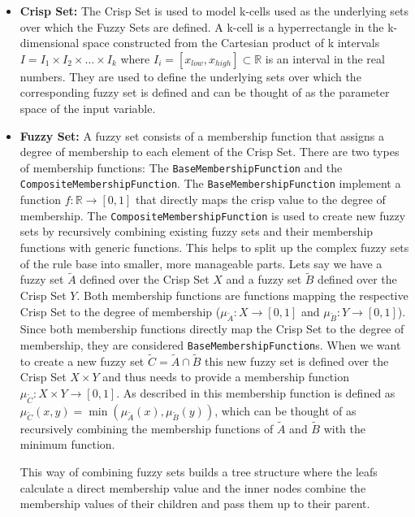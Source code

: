 \begin{itemize}
  \item \textbf{Crisp Set:} The Crisp Set is used to model k-cells used as the underlying sets over which the Fuzzy Sets are defined. A k-cell is a hyperrectangle in the k-dimensional space constructed from the Cartesian product of k intervals $I = I_1 \times I_2 \times \ldots \times I_k$ where $I_i = [x_{low}, x_{high}] \subset \mathbb{R} $ is an interval in the real numbers. They are used to define the underlying sets over which the corresponding fuzzy set is defined and can be thought of as the parameter space of the input variable.


  \item \textbf{Fuzzy Set:} A fuzzy set consists of a membership function that assigns a degree of membership to each element of the Crisp Set. There are two types of membership functions: The \texttt{BaseMembershipFunction} and the \texttt{CompositeMembershipFunction}. The \texttt{BaseMembershipFunction} implement a function $f: \mathbb{R} \rightarrow [0, 1]$ that directly maps the crisp value to the degree of membership. The \texttt{CompositeMembershipFunction} is used to create new fuzzy sets by recursively combining existing fuzzy sets and their membership functions with generic functions. This helps to split up the complex fuzzy sets of the rule base into smaller, more manageable parts. Lets say we have a fuzzy set $\tilde{A}$ defined over the Crisp Set $X$ and a fuzzy set $\tilde{B}$ defined over the Crisp Set $Y$. Both membership functions are functions mapping the respective Crisp Set to the degree of membership ($\mu_{\tilde{A}}: X \rightarrow [0, 1]$ and $\mu_{\tilde{B}}: Y \rightarrow [0, 1]$). Since both membership functions directly map the Crisp Set to the degree of membership, they are considered \texttt{BaseMembershipFunction}s. When we want to create a new fuzzy set $\tilde{C} = \tilde{A} \cap \tilde{B}$ this new fuzzy set is defined over the Crisp Set $X \times Y$  and thus needs to provide a membership function $\mu_{\tilde{C}}: X \times Y \rightarrow [0, 1]$. As described in  this membership function is defined as $\mu_{\tilde{C}}(x, y) = \min(\mu_{\tilde{A}}(x), \mu_{\tilde{B}}(y))$, which can be thought of as recursively combining the membership functions of $\tilde{A}$ and $\tilde{B}$ with the minimum function.

        This way of combining fuzzy sets builds a tree structure where the leafs calculate a direct membership value and the inner nodes combine the membership values of their children and pass them up to their parent.


\end{itemize}
